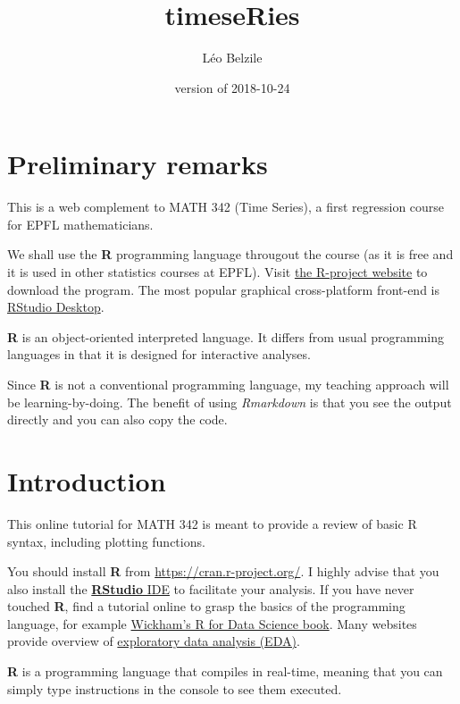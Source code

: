 \documentclass[]{book}
\title{timeseRies}
\author{Léo Belzile}
\date{version of 2018-10-24}
\begin{document}
\maketitle

{
\setcounter{tocdepth}{1}
\tableofcontents
}
\hypertarget{preliminary-remarks}{%
\chapter*{Preliminary remarks}\label{preliminary-remarks}}

This is a web complement to MATH 342 (Time Series), a first regression
course for EPFL mathematicians.

We shall use the \textbf{R} programming language througout the course
(as it is free and it is used in other statistics courses at EPFL).
Visit \href{https://cran.r-project.org/}{the R-project website} to
download the program. The most popular graphical cross-platform
front-end is
\href{https://www.rstudio.com/products/rstudio/download/}{RStudio
Desktop}.

\textbf{R} is an object-oriented interpreted language. It differs from
usual programming languages in that it is designed for interactive
analyses.

Since \textbf{R} is not a conventional programming language, my teaching
approach will be learning-by-doing. The benefit of using
\emph{Rmarkdown} is that you see the output directly and you can also
copy the code.

\hypertarget{introduction}{%
\chapter{Introduction}\label{introduction}}

This online tutorial for MATH 342 is meant to provide a review of basic
R syntax, including plotting functions.

You should install \textbf{R} from \url{https://cran.r-project.org/}. I
highly advise that you also install the
\href{http://rstudio.com}{\textbf{RStudio} IDE} to facilitate your
analysis. If you have never touched \textbf{R}, find a tutorial online
to grasp the basics of the programming language, for example
\href{http://r4ds.had.co.nz/}{Wickham's R for Data Science book}. Many
websites provide overview of
\href{http://r4ds.had.co.nz/exploratory-data-analysis.html}{exploratory
data analysis (EDA)}.

\textbf{R} is a programming language that compiles in real-time, meaning
that you can simply type instructions in the console to see them
executed.
\end{document}
